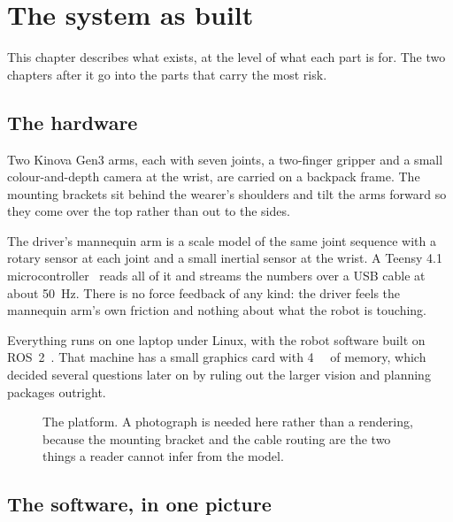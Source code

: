 \chapter{The system as built}
\label{ch:system}

This chapter describes what exists, at the level of what each part is for.
The two chapters after it go into the parts that carry the most risk.

\section{The hardware}

Two Kinova Gen3 arms, each with seven joints, a two-finger gripper and a small
colour-and-depth camera at the wrist, are carried on a backpack frame. The
mounting brackets sit behind the wearer's shoulders and tilt the arms forward
so they come over the top rather than out to the sides.

The driver's mannequin arm is a scale model of the same joint sequence with a
rotary sensor at each joint and a small inertial sensor at the wrist. A Teensy
4.1 microcontroller~\cite{pjrc2020teensy41} reads all of it and streams the
numbers over a USB cable at about \SI{50}{\hertz}. There is no force feedback
of any kind: the driver feels the mannequin arm's own friction and nothing
about what the robot is touching.

Everything runs on one laptop under Linux, with the robot software built on
ROS~2~\cite{macenski2022ros2}. That machine has a small graphics card with
\SI{4}{\giga\byte} of memory, which decided several questions later on by
ruling out the larger vision and planning packages outright.

\begin{figure}[htbp]
  \centering
  \caption[The platform]{The platform. A photograph is needed here rather than
  a rendering, because the mounting bracket and the cable routing are the two
  things a reader cannot infer from the model.}
  \label{fig:platform}
\end{figure}

\section{The software, in one picture}

